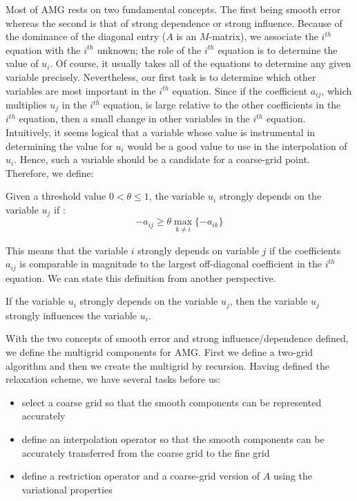 Most of AMG rests on two fundamental concepts. The first being smooth error
whereas the second is that of strong dependence or strong influence. Because
of the dominance of the diagonal entry ($A$ is an $M$-matrix), we associate
the $i^{th}$ equation with the $i^{th}$ unknown; the role of the $i^{th}$
equation is to determine the value of $u_i$. Of course, it usually takes all
of the equations to determine any given variable precisely. Nevertheless, our
first task is to determine which other variables are most important in the
$i^{th}$ equation. Since if the coefficient $a_{ij}$, which multiplies $u_j$
in the $i^{th}$ equation, is large relative to the other coefficients in the
$i^{th}$ equation, then a small change in other variables in the $i^{th}$
equation. Intuitively, it seems logical that a variable whose value is
instrumental in determining the value for $u_i$ would be a good value to use
in the interpolation of $u_i$. Hence, such a variable should be a candidate
for a coarse-grid point. Therefore, we define:
\begin{definition}
Given a threshold value $0<\theta \leq 1$, the variable $u_i$ strongly depends
on the variable $u_j$ if :
\begin{equation}
-a_{ij} \geq \theta \max_{k\neq i}\{-a_{ik}\}
\end{equation}
\end{definition}
This means that the variable $i$ strongly depends on variable $j$ if the
coefficients $a_{ij}$ is comparable in magnitude to the largest off-diagonal
coefficient in the $i^{th}$ equation. We can state this definition from
another perspective. 
\begin{definition}
If the variable $u_i$ strongly depends on the variable $u_j$, then the
variable $u_j$ strongly influences the variable $u_i$.
\end{definition}
With the two concepts of smooth error and strong influence/dependence defined,
we define the multigrid components for AMG. First we define a two-grid
algorithm and then we create the multigrid by recursion. Having defined the
relaxation scheme, we have several tasks before us:
\begin{itemize}
\item select a coarse grid so that the smooth components can be represented
accurately
\item define an interpolation operator so that the smooth components can be
accurately transferred from the coarse grid to the fine grid
\item define a restriction operator and a coarse-grid version of $A$ using the
variational properties
\end{itemize}

